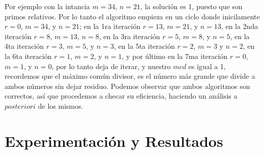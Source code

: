 \documentclass[12pt,twoside]{article}
\begin{document}
Por ejemplo con la intancia $m=34$, $n=21$, la soluci\'on es 1, puesto que son primos relativos. Por lo tanto el algoritmo empieza en un ciclo donde inicilamente $r=0$, $m=34$, y $n=21$; en la 1ra iteraci\'on $r=13$, $m=21$, y $n=13$, en la 2nda iteraci\'on $r=8$, $m=13$, $n=8$, en la 3ra iteraci\'on $r=5$, $m=8$, y $n=5$, en la 4ta iteraci\'on $r=3$, $m=5$, y $n=3$, en la 5ta iteraci\'on $r=2$, $m=3$ y $n=2$, en la 6ta iteraci\'on $r=1$, $m=2$, y $n=1$, y por \'ultimo en la 7ma iteraci\'on $r=0$, $m=1$, y $n=0$, por lo tanto deja de iterar, y nuestro $mcd$ es igual a 1, recordemos que el m\'aximo com\'un divisor, es el n\'umero m\'as grande que divide a ambos n\'umeros sin dejar residuo.
\newline
\newline 
Podemos observar que ambos algoritmos son correctos, así que procedemos a checar su eficiencia, haciendo un análisis a $posteriori$ de los mismos.

\section{Experimentaci\'on y Resultados}
\end{document}
